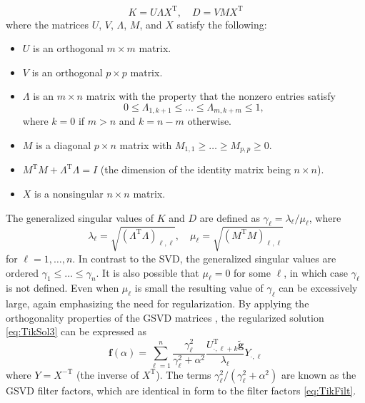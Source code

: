 \documentclass[12pt]{book}
\newcommand{\gnoiseVec}{\widetilde{\mathbf{g}}}	%
\newcommand{\kMat}{K}	%
\newcommand{\fVec}{\mathbf{f}}	%
\newcommand{\trans}{\mathrm{T}}	%
\newcommand{\regparam}{\alpha}
\begin{document}
\begin{equation}
\label{eq:GSVD matrices}
\kMat = U\Lambda X^\trans, \quad D = VMX^\trans
\end{equation}
where the matrices $U$, $V$, $\Lambda$, $M$, and $X$ satisfy the following: 
\begin{itemize}
\item $U$ is an orthogonal $m \times m$ matrix. 
\item $V$ is an orthogonal $p \times p$ matrix.
\item $\Lambda$ is an $m \times n$ matrix with the property that the nonzero entries satisfy
\[0 \leq \Lambda_{1,k+1} \leq \ldots \leq \Lambda_{m,k+m} \leq 1,\]
where $k = 0$ if $m > n$ and $k = n-m$ otherwise. 
\item $M$ is a diagonal $p \times n$ matrix with $M_{1,1} \geq \ldots \geq M_{p,p} \geq 0.$
\item $M^\trans M + \Lambda^\trans \Lambda = I$ (the dimension of the identity matrix being $n \times n$).
\item $X$ is a nonsingular $n \times n$ matrix.
\end{itemize}
The generalized singular values of $\kMat$ and $D$ are defined as $\gamma_\ell = \lambda_{\ell}/\mu_{\ell}$, where
\begin{equation}
\label{eq:GSVD lambda}
\lambda_\ell = \sqrt{(\Lambda^\trans \Lambda)_{\ell,\ell}}, \quad \mu_\ell = \sqrt{(M^\trans M)_{\ell,\ell}}
\end{equation}
for $\ell = 1,\ldots,n$. In contrast to the SVD, the generalized singular values are ordered $\gamma_1 \leq \ldots \leq \gamma_n$. It is also possible that $\mu_\ell = 0$ for some $\ell$, in which case $\gamma_\ell$ is not defined. Even when $\mu_\ell$ is small the resulting value of $\gamma_\ell$ can be excessively large, again emphasizing the need for regularization. By applying the orthogonality properties of the GSVD matrices \cite[p.~105-106]{ABT}, the regularized solution \eqref{eq:TikSol3} can be expressed as
\begin{equation}
\label{eq:TikSol GSVD}
\fVec(\regparam) = \sum_{\ell=1}^n \frac{\gamma_\ell^2}{\gamma_\ell^2 + \regparam^2} \frac{U_{\cdot,\ell+k}^\trans\gnoiseVec}{\lambda_\ell}Y_{\cdot,\ell}
\end{equation}
where $Y = X^{-\trans}$ (the inverse of $X^\trans$). The terms $\gamma_\ell^2/(\gamma_\ell^2 + \regparam^2)$ are known as the GSVD filter factors, which are identical in form to the filter factors \eqref{eq:TikFilt}. \par 
\end{document}
